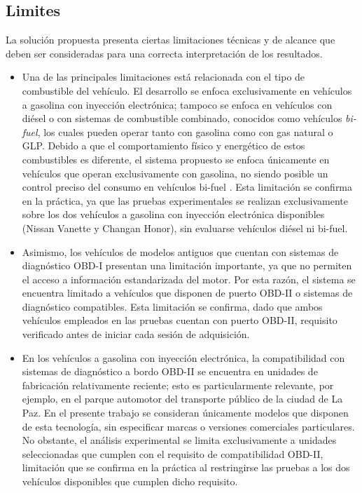 \subsection{Limites}

La solución propuesta presenta ciertas limitaciones técnicas y de alcance que deben ser consideradas para una correcta interpretación de los resultados.

\begin{itemize}
	\item Una de las principales limitaciones está relacionada con el tipo de combustible del vehículo. El desarrollo se enfoca exclusivamente en vehículos a gasolina con inyección electrónica; tampoco se enfoca en vehículos con diésel o con sistemas de combustible combinado, conocidos como vehículos \textit{bi-fuel}, los cuales pueden operar tanto con gasolina como con gas natural o GLP. Debido a que el comportamiento físico y energético de estos combustibles es diferente, el sistema propuesto se enfoca únicamente en vehículos que operan exclusivamente con gasolina, no siendo posible un control preciso del consumo en vehículos bi-fuel \citep{AFDC_BiFuelVehicles}. Esta limitación se confirma en la práctica, ya que las pruebas experimentales se realizan exclusivamente sobre los dos vehículos a gasolina con inyección electrónica disponibles (Nissan Vanette y Changan Honor), sin evaluarse vehículos diésel ni bi-fuel.
	\item Asimismo, los vehículos de modelos antiguos que cuentan con sistemas de diagnóstico OBD-I presentan una limitación importante, ya que no permiten el acceso a información estandarizada del motor. Por esta razón, el sistema se encuentra limitado a vehículos que disponen de puerto OBD-II o sistemas de diagnóstico compatibles. Esta limitación se confirma, dado que ambos vehículos empleados en las pruebas cuentan con puerto OBD-II, requisito verificado antes de iniciar cada sesión de adquisición.
	\item En los vehículos a gasolina con inyección electrónica, la compatibilidad con sistemas de diagnóstico a bordo OBD-II se encuentra en unidades de fabricación relativamente reciente; esto es particularmente relevante, por ejemplo, en el parque automotor del transporte público de la ciudad de La Paz. En el presente trabajo se consideran únicamente modelos que disponen de esta tecnología, sin especificar marcas o versiones comerciales particulares.
	No obstante, el análisis experimental se limita exclusivamente a unidades seleccionadas que cumplen con el requisito de compatibilidad OBD-II, limitación que se confirma en la práctica al restringirse las pruebas a los dos vehículos disponibles que cumplen dicho requisito.

\end{itemize}
